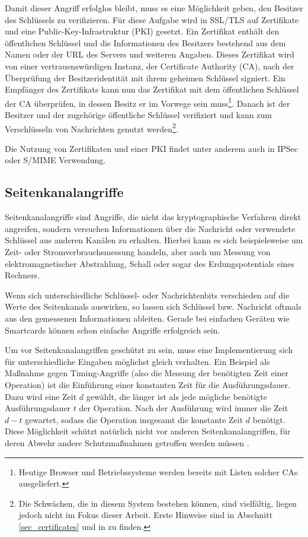 Damit dieser Angriff erfolglos bleibt, muss es eine Möglichkeit geben, den Besitzer des Schlüssels zu verifizieren. Für diese Aufgabe wird in SSL/TLS auf Zertifikate und eine Public-Key-Infrastruktur (PKI) gesetzt. Ein Zertifikat enthält den öffentlichen Schlüssel und die Informationen des Besitzers bestehend aus dem Namen oder der URL des Servers und weiteren Angaben. Dieses Zertifikat wird von einer vertrauenswürdigen Instanz, der Certificate Authority (CA), nach der Überprüfung der Besitzeridentität mit ihrem geheimen Schlüssel signiert. Ein Empfänger des Zertifikats kann nun das Zertifikat mit dem öffentlichen Schlüssel der CA überprüfen, in dessen Besitz er im Vorwege sein muss\footnote{
	Heutige Browser und Betriebssysteme werden bereits mit Listen solcher CAs ausgeliefert.
}. Danach ist der Besitzer und der zugehörige öffentliche Schlüssel verifiziert und kann zum Verschlüsseln von Nachrichten genutzt werden\footnote{
	Die Schwächen, die in diesem System bestehen können, sind vielfältig, liegen jedoch nicht im Fokus dieser Arbeit. Erste Hinweise sind in Abschnitt \ref{sec_certificates} und in \cite{ferguson10} zu finden.
}. 

Die Nutzung von Zertifikaten und einer PKI findet unter anderem auch in IPSec oder S/MIME Verwendung. 

\subsection{Seitenkanalangriffe}
Seitenkanalangriffe sind Angriffe, die nicht das kryptographische Verfahren direkt angreifen, sondern versuchen Informationen über die Nachricht oder verwendete Schlüssel aus anderen Kanälen zu erhalten. Hierbei kann es sich beispielsweise um Zeit- oder Stromverbrauchsmessung handeln, aber auch um Messung von elektromagnetischer Abstrahlung, Schall oder sogar des Erdungspotentials eines Rechners. 

Wenn sich unterschiedliche Schlüssel- oder Nachrichtenbits verschieden auf die Werte des Seitenkanals auswirken, so lassen sich Schlüssel bzw. Nachricht oftmals aus den gemessenen Informationen ableiten. Gerade bei einfachen Geräten wie Smartcards können schon einfache Angriffe erfolgreich sein.

Um vor Seitenkanalangriffen geschützt zu sein, muss eine Implementierung sich für unterschiedliche Eingaben möglichst gleich verhalten. Ein Beispiel als Maßnahme gegen Timing-Angriffe (also die Messung der benötigten Zeit einer Operation) ist die Einführung einer konstanten Zeit für die Ausführungsdauer. Dazu wird eine Zeit \(d\) gewählt, die länger ist als jede mögliche benötigte Ausführungsdauer \(t\) der Operation. Nach der Ausführung wird immer die Zeit \(d-t\) gewartet, sodass die Operation insgesamt die konstante Zeit \(d\) benötigt. Diese Möglichkeit schützt natürlich nicht vor anderen Seitenkanalangriffen, für deren Abwehr andere Schutzmaßnahmen getroffen werden müssen \cite{ferguson10}.

